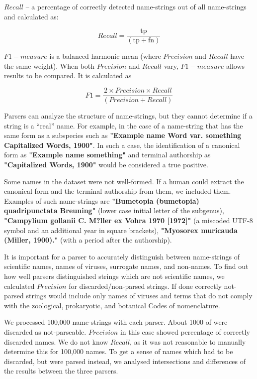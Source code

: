 \documentclass{bmcart}
\begin{document}
$Recall$ -- a percentage of correctly detected name-strings out of all name-strings and calculated as:

\[Recall = \dfrac{\text{tp}}{(\text{tp} + \text{fn})}\]

$F1-measure$ is a balanced harmonic mean (where $Precision$ and $Recall$ have
the same weight). When both $Precision$ and $Recall$ vary, $F1-measure$ allows
results to be compared. It is calculated as

\[F1 = \dfrac{2 \times Precision \times Recall}{(Precision + Recall)}\]

Parsers can analyze the structure of name-strings, but they cannot determine
if a string is a ``real'' name. For example, in the case of a name-string that has the same form as a subspecies such as \textbf{"Example name Word
var. something Capitalized Words, 1900"}. In such a case, the identification of a canonical form as \textbf{"Example
name something"} and terminal authorship as \textbf{"Capitalized Words, 1900"}
would be considered a true positive.

Some names in the dataset were not well-formed. If a human could extract the
canonical form and the terminal authorship from them, we included them.
Examples of such name-strings are \textbf{"Bumetopia (bumetopia)
quadripunctata Breuning"} (lower case initial letter of the subgenus), \textbf{"Campylium gollanii C.
M?ller ex Vohra 1970 [1972]"} (a miscoded UTF-8 symbol and an additional year in
square brackets), \textbf{"Myosorex muricauda (Miller, 1900)."} (with a period after the authorship).

It is important for a parser to accurately distinguish between name-strings of
scientific names, names of viruses, surrogate names, and non-names. To find
out how well parsers distinguished strings which are not scientific names, we
calculated $Precision$ for discarded/non-parsed strings. If done correctly
not-parsed strings would include only names of viruses and terms that do not comply with the zoological, prokaryotic, and botanical Codes of nomenclature.

We processed 100,000 name-strings with each parser. About 1000 of
were discarded as not-parseable. $Precision$ in this case showed
percentage of correctly discarded names.  We do not know $Recall$, as it was
not reasonable to manually determine this for 100,000 names. To get a sense of names 
which had to be discarded, but were parsed instead, we analysed intersections
and differences of the results between the three parsers.
\end{document}
